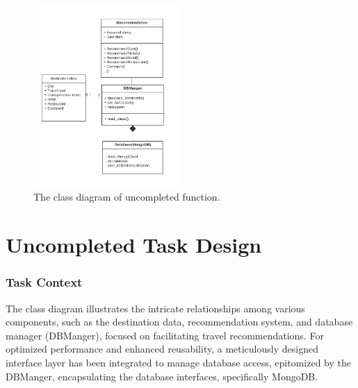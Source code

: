 \documentclass[conference]{IEEEtran}
\begin{document}
\begin{figure}[htbp]
	\centerline{\includegraphics[width=0.5\textwidth]{uncompleted/class_uncompleted.pdf}}
	\caption{The class diagram of uncompleted function. }
	\label{uncompleted1}
\end{figure}

\section{\textbf{Uncompleted Task Design }}


\subsubsection{\textbf{Task Context }}

The class diagram illustrates the intricate relationships among various components, such as the destination data, recommendation system, and database manager (DBManger), focused on facilitating travel recommendations. For optimized performance and enhanced reusability, a meticulously designed interface layer has been integrated to manage database access, epitomized by the DBManger, encapsulating the database interfaces, specifically MongoDB.
\end{document}
